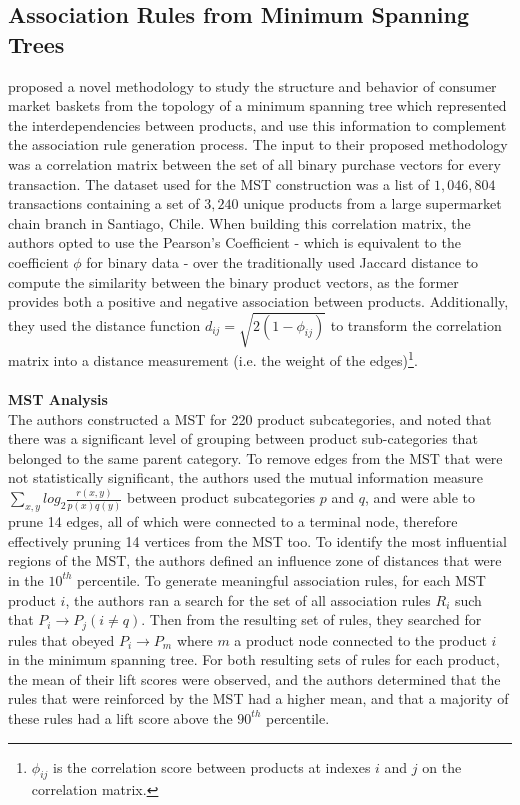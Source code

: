 \subsection{Association Rules from Minimum Spanning Trees}
\label{sec:mst paper}
 proposed a novel methodology to study the structure and behavior of consumer market baskets from the topology of a minimum spanning tree which represented the interdependencies between products, and use this information to complement the association rule generation process. The input to their proposed methodology was a correlation matrix between the set of all binary purchase vectors for every transaction.  The dataset used for the MST construction was a list of $1,046,804$ transactions containing a set of $3,240$ unique products from a large supermarket chain branch in Santiago, Chile.  When building this correlation matrix, the authors opted to use the Pearson's Coefficient  - which is equivalent to the coefficient $\phi$ for binary data  - over the traditionally used Jaccard distance to compute the similarity between the binary product vectors, as the former provides both a positive and negative association between products. Additionally,  they used the distance function $d_{ij} = \sqrt{2(1-\phi_{ij})}$ to transform the correlation matrix into a distance measurement (i.e. the weight of the edges)\footnote{$\phi_{ij}$ is the correlation score between products at indexes $i$ and $j$ on the correlation matrix.}. 
\\\\\textbf{MST Analysis}\\
The authors constructed a MST for 220 product subcategories, and noted that there was a significant level of grouping between product sub-categories that belonged to the same parent category.  To remove edges from the MST that were not statistically significant,  the authors used the mutual information  measure $\sum\limits_{x,y}log_2 \frac{r(x,y)}{p(x)q(y)}$ between product subcategories $p$ and $q$, and were able to prune 14 edges, all of which were connected to a terminal node, therefore effectively pruning 14 vertices from the MST too. To identify the most influential regions of the MST, the authors defined an influence zone of distances that were in the $10^{th}$ percentile. To generate meaningful association rules,  for each MST product $i$, the authors ran a search for the set of all association rules $R_i$ such that $P_i \rightarrow P_j (i \neq q)$. Then from the resulting set of rules, they searched for rules that obeyed $P_i \rightarrow P_m$ where $m$ a product node connected to the product $i$ in the minimum spanning tree.  For both resulting sets of rules for each product, the mean of their lift scores were observed, and the authors determined that the rules that were reinforced by the MST had a higher mean, and that a majority of these rules had a lift score above the $90^{th}$ percentile. 
